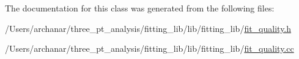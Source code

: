 The documentation for this class was generated from the following files\+:\begin{DoxyCompactItemize}
\item 
/\+Users/archanar/three\+\_\+pt\+\_\+analysis/fitting\+\_\+lib/lib/fitting\+\_\+lib/\mbox{\hyperlink{lib_2fitting__lib_2fit__quality_8h}{fit\+\_\+quality.\+h}}\item 
/\+Users/archanar/three\+\_\+pt\+\_\+analysis/fitting\+\_\+lib/lib/fitting\+\_\+lib/\mbox{\hyperlink{fit__quality_8cc}{fit\+\_\+quality.\+cc}}\end{DoxyCompactItemize}
